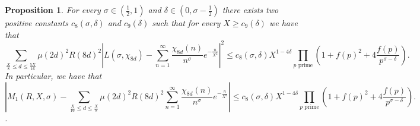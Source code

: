 \documentclass[10pt,a4paper]{amsart}
\theoremstyle{plain}
\newtheorem{proposition}[theorem]{Proposition}
\theoremstyle{definition}
\theoremstyle{remark}
\begin{document}
\begin{proposition}
\label{L-function approximation}
For every $\sigma \in (\frac{1}{2},1)$ and $\delta \in \left(0, \sigma-\frac{1}{2}\right)$ there exists two positive constants $c_8(\sigma,\delta)$ and $c_9(\delta)$ such that for every $X \geq c_9(\delta)$ we have that
\begin{equation}\label{error}
\sum_{\frac{X}{8}\leq d\leq \frac{5X}{16}}\mu(2d)^2R(8d)^2\left|L(\sigma,\chi_{8d})-\sum_{n=1}^{\infty}\frac{\chi_{8d}(n)}{n^\sigma} e^{-\frac{n}{X^2}}\right|^2 \leq c_8(\sigma,\delta) X^{1-4\delta}\prod_{p\text{ prime}}\left(1+f(p)^2+4\frac{f(p)}{p^{\sigma-\delta}}\right).
\end{equation}
In particular, we have that
\[
\left\lvert M_1(R,X,\sigma) - \sum_{\frac{X}{16}\leq d\leq \frac{X}{8}}\mu(2d)^2R(8d)^2\sum_{n=1}^{\infty}\frac{\chi_{8d}(n)}{n^\sigma} e^{-\frac{n}{X^2}} \right\rvert \leq c_8(\sigma,\delta) X^{1-4\delta}\prod_{p\text{ prime}}\left(1+f(p)^2+4\frac{f(p)}{p^{\sigma-\delta}}\right).
\].
\end{proposition}
\end{document}
